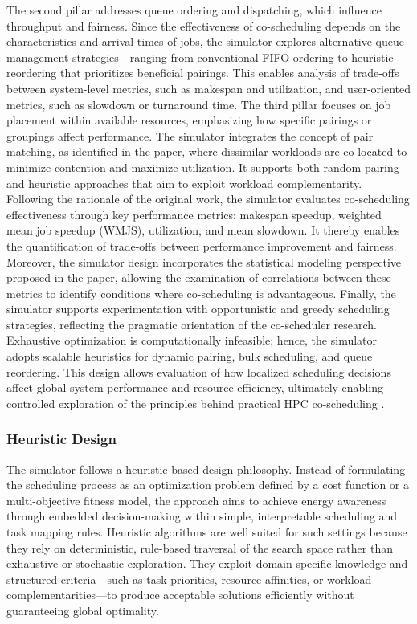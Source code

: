 The second pillar addresses queue ordering and dispatching, which influence throughput and fairness. Since the effectiveness of co-scheduling depends on the characteristics and arrival times of jobs, the simulator explores alternative queue management strategies—ranging from conventional FIFO ordering to heuristic reordering that prioritizes beneficial pairings. This enables analysis of trade-offs between system-level metrics, such as makespan and utilization, and user-oriented metrics, such as slowdown or turnaround time.
The third pillar focuses on job placement within available resources, emphasizing how specific pairings or groupings affect performance. The simulator integrates the concept of pair matching, as identified in the paper, where dissimilar workloads are co-located to minimize contention and maximize utilization. It supports both random pairing and heuristic approaches that aim to exploit workload complementarity.
Following the rationale of the original work, the simulator evaluates co-scheduling effectiveness through key performance metrics: makespan speedup, weighted mean job speedup (WMJS), utilization, and mean slowdown. It thereby enables the quantification of trade-offs between performance improvement and fairness. Moreover, the simulator design incorporates the statistical modeling perspective proposed in the paper, allowing the examination of correlations between these metrics to identify conditions where co-scheduling is advantageous.
Finally, the simulator supports experimentation with opportunistic and greedy scheduling strategies, reflecting the pragmatic orientation of the co-scheduler research. Exhaustive optimization is computationally infeasible; hence, the simulator adopts scalable heuristics for dynamic pairing, bulk scheduling, and queue reordering. This design allows evaluation of how localized scheduling decisions affect global system performance and resource efficiency, ultimately enabling controlled exploration of the principles behind practical HPC co-scheduling \cite{unknown}.

\subsubsection{Heuristic Design}
\label{sec:heuristic_design}
The simulator follows a heuristic-based design philosophy. Instead of formulating the scheduling process as an optimization problem defined by a cost function or a multi-objective fitness model, the approach aims to achieve energy awareness through embedded decision-making within simple, interpretable scheduling and task mapping rules. Heuristic algorithms are well suited for such settings because they rely on deterministic, rule-based traversal of the search space rather than exhaustive or stochastic exploration. They exploit domain-specific knowledge and structured criteria—such as task priorities, resource affinities, or workload complementarities—to produce acceptable solutions efficiently without guaranteeing global optimality.

